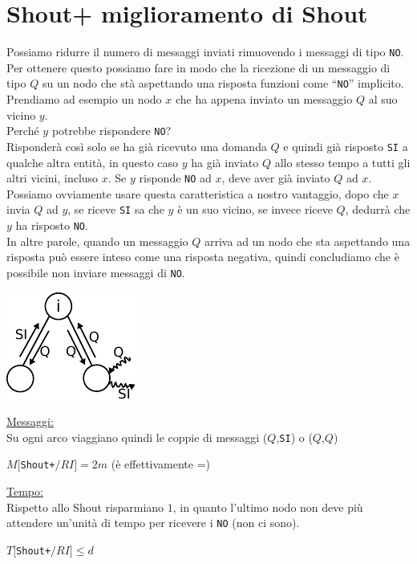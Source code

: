 \section{Shout+ miglioramento di Shout}
Possiamo ridurre il numero di messaggi inviati rimuovendo i messaggi di tipo
\texttt{NO}. Per ottenere questo possiamo fare in modo che la ricezione di un
messaggio di tipo $Q$ su un nodo che stà aspettando una risposta funzioni come
``\texttt{NO}'' implicito.\\
Prendiamo ad esempio un nodo $x$ che ha appena inviato un messaggio $Q$ al suo
vicino $y$.\\ Perché $y$ potrebbe rispondere \texttt{NO}? \\Risponderà così solo
se ha già ricevuto una domanda $Q$ e quindi già risposto \texttt{SI} a qualche
altra entità, in questo caso $y$ ha già inviato $Q$ allo stesso tempo a tutti
gli altri vicini, incluso $x$. Se $y$ risponde \texttt{NO} ad $x$, deve aver già
inviato $Q$ ad $x$. Possiamo ovviamente usare questa caratteristica a nostro
vantaggio, dopo che $x$ invia $Q$ ad $y$, se riceve \texttt{SI} sa che $y$ è un
suo vicino, se invece riceve $Q$, dedurrà che $y$ ha risposto \texttt{NO}.\\
In altre parole, quando un messaggio $Q$ arriva ad un nodo che sta aspettando una
risposta può essere inteso come una risposta negativa, quindi concludiamo che è
possibile non inviare messaggi di \texttt{NO}.
\begin{center}
    \includegraphics[scale=1.4]{capitoli/costruzione-spanning-tree/imgs/n_23}
\end{center}
\underline{Messaggi:}\\
Su ogni arco viaggiano quindi le coppie di messaggi ($Q$,\texttt{SI}) o
($Q$,$Q$)

\begin{center}
    $M[$\texttt{Shout+}$/RI] = 2m$ (è effettivamente =)\\
\end{center}

\underline{Tempo:}\\
Rispetto allo Shout risparmiano $1$, in quanto l'ultimo nodo non deve più
attendere un'unità di tempo per ricevere i \texttt{NO} (non ci sono).
\begin{center}
    $T[$\texttt{Shout+}$/RI] \leq d$
\end{center}

